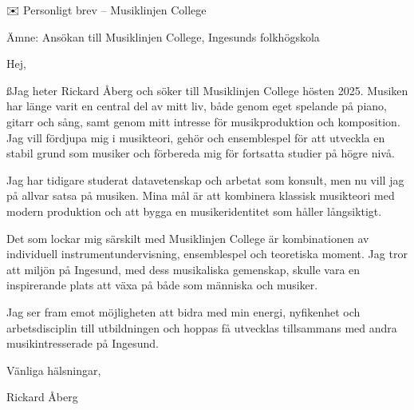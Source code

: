 \documentclass[a4paper,10pt]{letter}
\begin{document}
\begin{letter}{✉️ Personligt brev – Musiklinjen College

Ämne: Ansökan till Musiklinjen College, Ingesunds folkhögskola}
\opening{Hej,}

ßJag heter Rickard Åberg och söker till Musiklinjen College hösten 2025.
Musiken har länge varit en central del av mitt liv, både genom eget spelande på piano, gitarr och sång, samt genom mitt intresse för musikproduktion och komposition. Jag vill fördjupa mig i musikteori, gehör och ensemblespel för att utveckla en stabil grund som musiker och förbereda mig för fortsatta studier på högre nivå.

Jag har tidigare studerat datavetenskap och arbetat som konsult, men nu vill jag på allvar satsa på musiken. Mina mål är att kombinera klassisk musikteori med modern produktion och att bygga en musikeridentitet som håller långsiktigt.

Det som lockar mig särskilt med Musiklinjen College är kombinationen av individuell instrumentundervisning, ensemblespel och teoretiska moment. Jag tror att miljön på Ingesund, med dess musikaliska gemenskap, skulle vara en inspirerande plats att växa på både som människa och musiker.

Jag ser fram emot möjligheten att bidra med min energi, nyfikenhet och arbetsdisciplin till utbildningen och hoppas få utvecklas tillsammans med andra musikintresserade på Ingesund.
\closing{Vänliga hälsningar,}

\vspace{1em}

Rickard Åberg\\
[0709431401] \\
[raberg@duck.com]
\end{letter}
\end{document}

